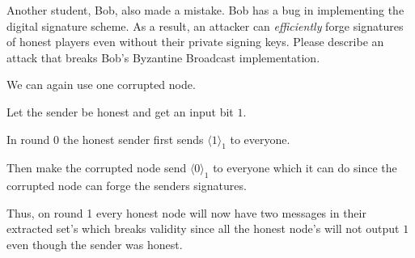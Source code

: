 \documentclass[12pt, letterpaper]{article}
\begin{document}
\begin{subproblem}{}
    Another student, Bob, also made a mistake. Bob has a bug in implementing the digital signature scheme. As a result, an attacker can \emph{efficiently} forge signatures of honest players even without their private signing keys. Please describe an attack that breaks Bob's Byzantine Broadcast implementation.
\end{subproblem}
\begin{problemproof}
    We can again use one corrupted node.

    Let the sender be honest and get an input bit $1$.

    In round 0 the honest sender first sends $\langle 1 \rangle_1$ to everyone.

    Then make the corrupted node send $\langle 0 \rangle_1$ to everyone which it can do since the corrupted node can forge the senders signatures.

    Thus, on round 1 every honest node will now have two messages in their extracted set's which breaks validity since all the honest node's will not output $1$ even though the sender was honest.
\end{problemproof}
\end{document}
